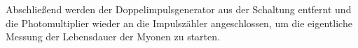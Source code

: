 Abschließend werden der Doppelimpulsgenerator aus der Schaltung entfernt und die Photomultiplier wieder an die Impulszähler angeschlossen,
um die eigentliche Messung der Lebensdauer der Myonen zu starten.
